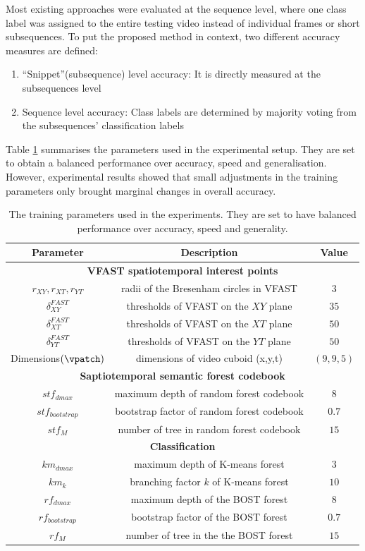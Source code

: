 Most existing approaches were evaluated at the sequence level, where one class label was assigned to the entire testing video instead of individual frames or short subsequences. 
To put the proposed method in context, two different accuracy measures are defined: 
\begin{enumerate}
\item ``Snippet''(subsequence) level accuracy: It is directly measured at the subsequences level 
\item Sequence level accuracy: Class labels are determined by majority voting from the subsequences' classification labels 
\end{enumerate}

Table \ref{tab/act/exparam} summarises the parameters used in the experimental setup. They are set to obtain a balanced performance over accuracy, speed and generalisation. However, experimental results showed that small adjustments in the training parameters only brought marginal changes in overall accuracy. 
\begin{table}
\centering
\begin{tabular}{|c|c|c|}
\hline
\textbf{Parameter} & \textbf{Description} & \textbf{Value} \\
\hline
\multicolumn{3}{|c|}{\textbf{VFAST spatiotemporal interest points}}\\
\hline
$r_{XY}, r_{XT}, r_{YT}$ & radii of the Bresenham circles in VFAST & $3$ \\
$\delta^{FAST}_{XY}$ & thresholds of VFAST on the $XY$ plane& $35$\\
$\delta^{FAST}_{XT}$ & thresholds of VFAST on the $XT$ plane& $50$\\
$\delta^{FAST}_{YT}$ & thresholds of VFAST on the $YT$ plane& $50$\\
Dimensions$(\vpatch)$ & dimensions of video cuboid (x,y,t)& $(9,9,5)$ \\
\hline
\multicolumn{3}{|c|}{\textbf{Saptiotemporal semantic forest codebook}}\\
\hline
$stf_{dmax}$ & maximum depth of random forest codebook & $8$ \\
$stf_{bootstrap}$ & bootstrap factor of random forest codebook & $0.7$ \\
$stf_M$ & number of tree in random forest codebook & $15$ \\
\hline
\multicolumn{3}{|c|}{\textbf{Classification}} \\
\hline
$km_{dmax}$ & maximum depth of K-means forest & $3$ \\
$km_k$ & branching factor $k$ of K-means forest & $10$ \\
$rf_{dmax}$ & maximum depth of the BOST forest & $8$ \\
$rf_{bootstrap}$ & bootstrap factor of the BOST forest& $0.7$ \\
$rf_M$ & number of tree in the the BOST forest& $15$ \\ 
\hline
\end{tabular}
\caption{The training parameters used in the experiments. They are set to have balanced performance over accuracy, speed and generality.}
\label{tab/act/exparam}
\end{table}


